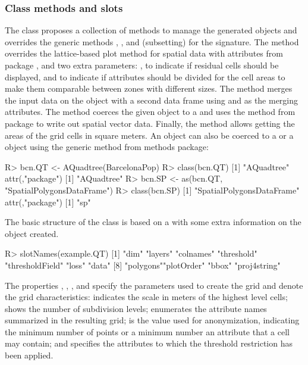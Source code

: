 

\subsubsection{Class methods and slots} \label{sec:methods}

The  class proposes a collection of methods to manage the generated objects and overrides the generic methods , ,  and \code{[} (subsetting) for the  signature. The  method overrides the lattice-based plot method for spatial data with attributes from  package \citep{Pebesma2005}, and two extra parameters: , to indicate if residual cells should be displayed, and  to indicate if attributes should be divided for the cell areas to make them comparable between zones with different sizes. The  method merges the input data on the  object with a second data frame using  and  as the merging attributes. The  method coerces the given  object to a  and uses the  method from  package \citep{Bivand2016} to write out spatial vector data. Finally, the  method allows getting the areas of the grid cells in square meters. An  object can also be coerced to a  or a  object using the generic method  from methods package:
%
\begin{example*}
R> bcn.QT <- AQuadtree(BarcelonaPop)
R> class(bcn.QT)
[1] "AQuadtree"
attr(,"package")
[1] "AQuadtree"
R> bcn.SP <- as(bcn.QT, "SpatialPolygonsDataFrame")
R> class(bcn.SP)
[1] "SpatialPolygonsDataFrame"
attr(,"package")
[1] "sp"
\end{example*}
%
The basic structure of the  class is based on a  with some extra information on the object created.
%
\begin{example*}
R> slotNames(example.QT)
[1] "dim" "layers" "colnames" "threshold" "thresholdField" "loss" "data"
[8] "polygons""plotOrder" "bbox" "proj4string"
\end{example*}
%
The properties , , ,  and  specify the parameters used to create the grid and denote the grid characteristics:  indicates the scale in meters of the highest level cells;  shows the number of subdivision levels;  enumerates the attribute names summarized in the resulting grid;  is the value used for anonymization, indicating the minimum number of points or a minimum number an attribute that a cell may contain; and  specifies the attributes to which the threshold restriction has been applied.

